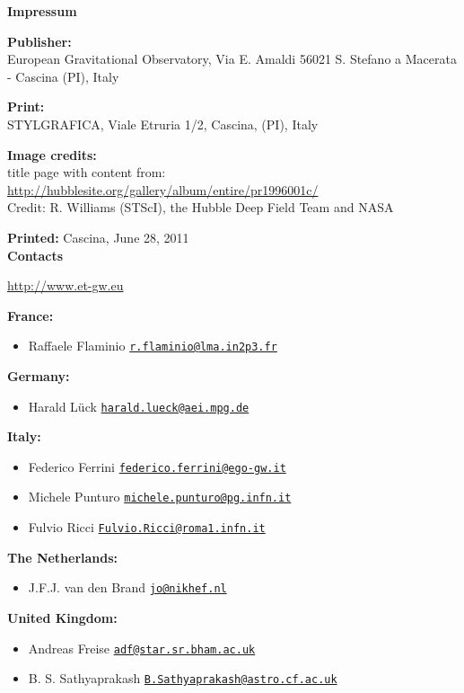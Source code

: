 {\LARGE \textbf {Impressum} }\par

\textbf {Publisher:}\\
European Gravitational Observatory, Via E. Amaldi 56021 S. Stefano a Macerata - Cascina (PI), Italy

\textbf{Print:}\\
STYLGRAFICA, Viale Etruria 1/2, Cascina, (PI), Italy


\textbf {Image credits:}\\
title page with content from: \url{http://hubblesite.org/gallery/album/entire/pr1996001c/}\\
Credit: R. Williams (STScI), the Hubble Deep Field Team and NASA



\textbf {Printed:} Cascina, June 28, 2011\\

\vskip 2cm
{\LARGE \textbf {Contacts} }\par
\url{http://www.et-gw.eu} \par 
\textbf {France:}
\begin{itemize}
\item Raffaele Flaminio \href{mailto:r.flaminio@lma.in2p3.fr}{\nolinkurl{r.flaminio@lma.in2p3.fr}}
\end{itemize}
\textbf {Germany:}
\begin{itemize}
\item Harald L\"{u}ck \href{mailto:harald.lueck@aei.mpg.de}{\nolinkurl{harald.lueck@aei.mpg.de}}
\end{itemize}
\textbf {Italy:}
\begin{itemize}
\item Federico Ferrini
\href{mailto:federico.ferrini@ego-gw.it}{\nolinkurl{federico.ferrini@ego-gw.it}}
\item Michele Punturo \href{mailto:michele.punturo@pg.infn.it}{\nolinkurl{michele.punturo@pg.infn.it}}
\item Fulvio Ricci \href{mailto:Fulvio.Ricci@roma1.infn.it}{\nolinkurl{Fulvio.Ricci@roma1.infn.it}}
\end{itemize}
\textbf {The Netherlands:}
\begin{itemize}
\item J.F.J. van den Brand 
\href{mailto:jo@nikhef.nl}{\nolinkurl{jo@nikhef.nl}}
\end{itemize}
\textbf {United Kingdom:}
\begin{itemize}
\item Andreas Freise \href{mailto:adf@star.sr.bham.ac.uk}{\nolinkurl{adf@star.sr.bham.ac.uk}}
\item B. S. Sathyaprakash \href{mailto:B.Sathyaprakash@astro.cf.ac.uk}{\nolinkurl{B.Sathyaprakash@astro.cf.ac.uk}}
\end{itemize}
	
	
	

